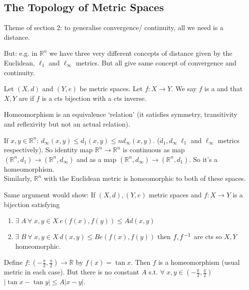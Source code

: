 \subsection{The Topology of Metric Spaces}
Theme of section 2: to generalise convergence/ continuity, all we need is a distance.

But: e.g. in $\mathbb{R}^n$ we have three very different concepts of distance given by the Euclidean, $\ell_1$ and $\ell_\infty$ metrics.
But all give same concept of convergence and continuity.

\begin{definition}[Homeomorphism]
    Let $(X, d)$ and $(Y, e)$ be metric spaces.
    Let $f : X \to Y$.
    We say $f$ is a  and that $X, Y$ are  if $f$ is a cts bijection with a cts inverse.
\end{definition} 

\begin{remark}
    Homeomorphism is an equivalence `relation' (it satisfies symmetry, transitivity and reflexivity but not an actual relation).
\end{remark} 

\begin{example}
    If $x, y \in \mathbb{R}^n$: $d_\infty(x, y) \leq d_1(x, y) \leq n d_\infty(x, y)$.
    ($d_1, d_\infty \ \ell_1$ and $\ell_\infty$ metrics respectively).
    So identity map $\mathbb{R}^n \to \mathbb{R}^n$ is continuous as map $(\mathbb{R}^n, d_1) \to (\mathbb{R}^n, d_\infty)$ and as a map $(\mathbb{R}^n, d_\infty) \to (\mathbb{R}^n, d_1)$.
    So it's a homeomorphism. \\
    Similarly, $\mathbb{R}^n$ with the Euclidean metric is homeomorphic to both of these spaces.
\end{example} 

\begin{example}
    Same argument would show:
    If $(X, d), (Y, e)$ metric spaces and $f: X \to Y$ is a bijection satisfying 
    \begin{enumerate}
        \item $\exists \; A \ \forall \; x, y \in X \ e(f(x), f(y)) \leq A d(x, y)$
        \item $\exists \; B \ \forall \; x, y \in X \ d(x, y) \leq B e(f(x), f(y))$ then $f, f^{-1}$ are cts so $X, Y$ homeomorphic.
    \end{enumerate} 
\end{example} 

\begin{example}
    Define $f:(-\frac{\pi}{2}, \frac{\pi}{2}) \to \mathbb{R}$ by $f(x) = \tan x$.
    Then $f$ is a homeomorphism (usual metric in each case).
    But there is no constant $A$ s.t. $\forall \; x, y \in (- \frac{\pi}{2}, \frac{\pi}{2})$ $|\tan x - \tan y| \leq A |x - y|$.
\end{example} 

